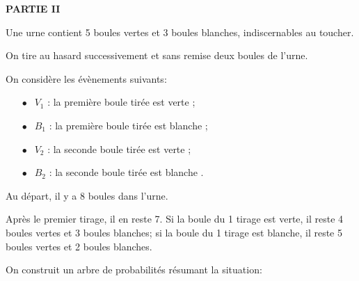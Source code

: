 \bigskip

\textbf{PARTIE II}

\medskip

Une urne contient 5 boules vertes et 3 boules blanches, indiscernables au toucher. 

On tire au hasard successivement et sans remise deux boules de l'urne.

On considère les évènements suivants:

\setlength\parindent{1cm}
\begin{itemize}
\item[$\bullet~~$] $V_1$ : \og la première boule tirée est verte \fg{} ;
\item[$\bullet~~$] $B_1$ : \og la première boule tirée est blanche \fg{} ;
\item[$\bullet~~$] $V_2$ : \og la seconde boule tirée est verte \fg{} ;
\item[$\bullet~~$] $B_2$ : \og la seconde boule tirée est blanche \fg.
\end{itemize}
\setlength\parindent{0cm}

Au départ, il y a 8 boules dans l'urne.

Après le premier tirage, il en reste 7. Si la boule du 1\ier{} tirage est verte, il reste 4 boules vertes et 3 boules blanches; si la boule du 1\ier{} tirage est blanche, il reste 5 boules vertes et 2 boules blanches.

On construit un arbre de probabilités résumant la situation:

\begin{center}
{%
{}
\pstree[treemode=R,nodesepA=0pt]%
       {\TR{}}
       {
	                        {
	                        }
	                        {
	                        }
      }
}
\end{center}


